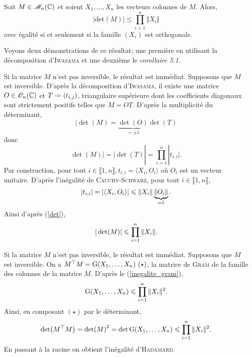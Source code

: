 
\begin{theo}
    Soit $M \in \mathscr{M}_n(\mathbb{C})$ et soient $X_1, \dots, X_n$ les vecteurs colonnes de $M$. Alors,
    $$|\mathrm{det}(M)| \leqslant \prod_{i=1}^{n} \Vert X_i \Vert$$
    avec égalité si et seulement si la famille $(X_i)$ est orthogonale.
\end{theo}

%    

Voyons deux démonstrations de ce résultat; une première en utilisant la décomposition d'\textsc{Iwasama} et une deuxième le \emph{corollaire 5.1}.

\begin{preuve}
    Si la matrice $M$ n'est pas inversible, le résultat est immédiat. Supposons que $M$ est inversible. D'après la décomposition d'\textsc{Iwasama}, il existe une matrice $O \in \mathscr{O}_n(\mathbb{C})$ et $T \defeq (t_{i,j})$, triangulaire supérieure dont les coefficients diagonaux sont strictement positifs telles que $M = OT$. D'après la multiplicité du déterminant, 
    $$|\det(M) = \underbrace{\det(O)}_{= \pm 1} \det(T)$$
    donc
    \begin{equation} \label{det}
        \det(M)| = |\det(T)| = \prod_{i=1}^{n} |t_{i,i}|.
    \end{equation}
    Par construction, pour tout $i \in \llbracket 1, n \rrbracket, t_{i,i} = \langle X_i, O_i \rangle$ où $O_i$ est un vecteur unitaire. D'après l'inégalité de \textsc{Cauchy}-\textsc{Schwarz}, pour tout $i \in \llbracket 1, n \rrbracket$, 
    $$|t_{i,i}| = |\langle X_i, O_i \rangle | \leqslant \Vert X_i \Vert \underbrace{\Vert O_i \Vert}_{=1}.$$
    Ainsi d'après (\ref{det}), 
    $$|\det(M)| \leqslant \prod_{i=1}^n \Vert X_i \Vert.$$
\end{preuve}

\begin{preuve}
    Si la matrice $M$ n'est pas inversible, le résultat est immédiat. Supposons que $M$ est inversible. On a $M^\top M = \mathrm{G}(X_1, \dots, X_n)\ (\star)$, la matrice de \textsc{Gram} de la famille des colonnes de la matrice $M$. D'après le (\ref{inegalite_gram}), 
    $$\mathrm{G}(X_1, \dots, X_n) \leqslant \prod_{i=1}^n \Vert X_i \Vert^2.$$
    Ainsi, en composant $(\star)$ par le déterminant, 
    $$\det(M^\top M) = \det(M)^2 = \det \mathrm{G}(X_1, \dots, X_n) \leqslant \prod_{i=1}^n \Vert X_i \Vert^2.$$
    En passant à la racine on obtient l'inégalité d'\textsc{Hadamard}.
\end{preuve}

